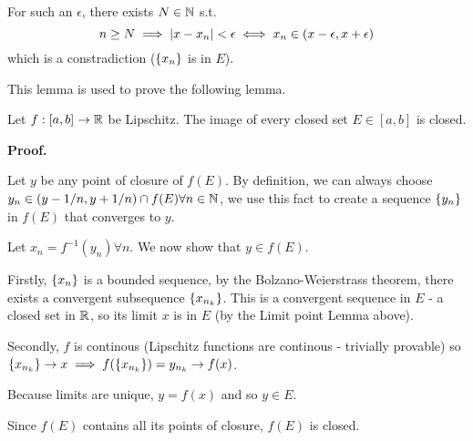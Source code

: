 For such an $\epsilon$, there exists $N\in \mathbb{N}$ s.t.
\[n\geq N \implies \left|x-x_n\right| < \epsilon \iff x_n \in (x-\epsilon, x+\epsilon)\]
which is a constradiction ($\left\{x_n\right\}$ is in $E$).

\noindent *This lemma is used to prove the following lemma.

\begin{lem}
   Let $f: [a,b]\to \mathbb{R}$ be Lipschitz. The image of every closed set $E\in [a,b]$ is closed.
\end{lem}
\textbf{Proof.}

Let $y$ be any point of closure of $f(E)$. 
By definition, we can always choose $y_n \in (y-1/n, y+1/n) \cap f(E) \forall n\in\mathbb{N}$, we use this fact to create a sequence $\left\{y_n\right\}$ in $f(E)$ that converges to $y$.

Let $x_n = f^{-1}(y_n) \forall n$. We now show that $y \in f(E)$.

Firstly, $\left\{x_n\right\}$ is a bounded sequence, by the Bolzano-Weierstrass theorem, there exists a convergent subsequence $\left\{x_{n_k}\right\}$.
This is a convergent sequence in $E$ - a closed set in $\mathbb{R}$, so its limit $x$ is in $E$ (by the Limit point Lemma above).

Secondly, $f$ is continous (Lipschitz functions are continous - trivially provable) so $\left\{x_{n_k}\right\} \to x \implies f(\left\{x_{n_k}\right\}) = y_{n_k} \to f(x)$.

Because limits are unique, $y = f(x)$ and so $y\in E$.

Since $f(E)$ contains all its points of closure, $f(E)$ is closed.

\bigskip

